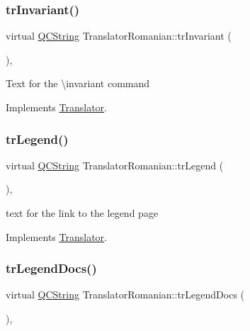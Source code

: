 \subsubsection{\texorpdfstring{trInvariant()}{trInvariant()}}
{\footnotesize\ttfamily virtual \mbox{\hyperlink{class_q_c_string}{Q\+C\+String}} Translator\+Romanian\+::tr\+Invariant (\begin{DoxyParamCaption}{ }\end{DoxyParamCaption})\hspace{0.3cm}{\ttfamily [inline]}, {\ttfamily [virtual]}}

Text for the \textbackslash{}invariant command 

Implements \mbox{\hyperlink{class_translator}{Translator}}.

\mbox{\label{class_translator_romanian_a69ad6813bb2be8929acba79e81b23bc2}} 
\subsubsection{\texorpdfstring{trLegend()}{trLegend()}}
{\footnotesize\ttfamily virtual \mbox{\hyperlink{class_q_c_string}{Q\+C\+String}} Translator\+Romanian\+::tr\+Legend (\begin{DoxyParamCaption}{ }\end{DoxyParamCaption})\hspace{0.3cm}{\ttfamily [inline]}, {\ttfamily [virtual]}}

text for the link to the legend page 

Implements \mbox{\hyperlink{class_translator}{Translator}}.

\mbox{\label{class_translator_romanian_a1365c5271c033fa63bebdaf259dd51fe}} 
\subsubsection{\texorpdfstring{trLegendDocs()}{trLegendDocs()}}
{\footnotesize\ttfamily virtual \mbox{\hyperlink{class_q_c_string}{Q\+C\+String}} Translator\+Romanian\+::tr\+Legend\+Docs (\begin{DoxyParamCaption}{ }\end{DoxyParamCaption})\hspace{0.3cm}{\ttfamily [inline]}, {\ttfamily [virtual]}}


